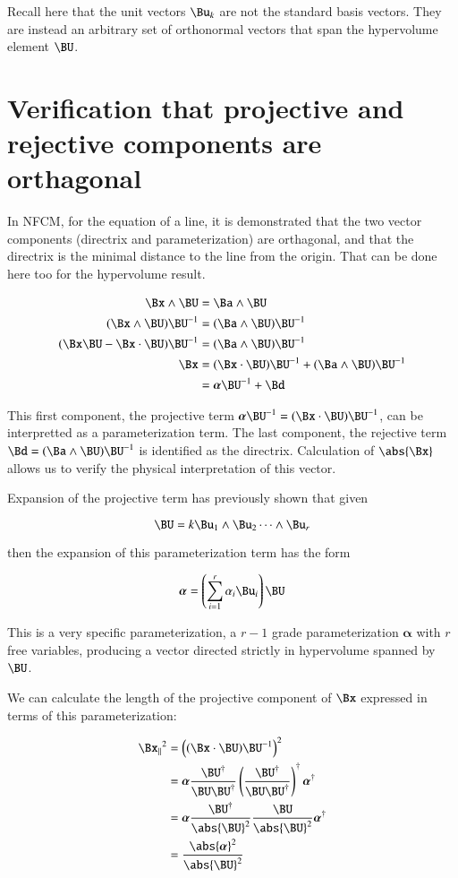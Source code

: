 \documentclass{article}
\newcommand{\Balpha}[0]{\boldsymbol{\alpha}}
\begin{document}
Recall here that the unit vectors $\Bu_k$ are not the standard basis vectors.
They are instead an arbitrary set of orthonormal vectors that span the hypervolume element $\BU$.

\section{ Verification that projective and rejective components are orthagonal }

In NFCM, for the equation of a line, it is demonstrated that the two vector components (directrix and parameterization) are orthagonal, and that the directrix is the minimal distance to the line from the origin.  That can be done here too for the hypervolume result.

\begin{align*}
\Bx \wedge \BU &= \Ba \wedge \BU \\
(\Bx \wedge \BU){\BU}^{-1} &= (\Ba \wedge \BU){\BU}^{-1} \\
(\Bx\BU - \Bx \cdot \BU){\BU}^{-1} &= (\Ba \wedge \BU){\BU}^{-1} \\
\Bx &= (\Bx \cdot \BU){\BU}^{-1} + (\Ba \wedge \BU){\BU}^{-1} \\
    &= \Balpha{\BU}^{-1} + \Bd \\
\end{align*}

This first component, the projective term $\Balpha{\BU}^{-1} = (\Bx \cdot \BU){\BU}^{-1}$, can be interpretted as a parameterization term.  The 
last component, the rejective term $\Bd = (\Ba \wedge \BU){\BU}^{-1}$ is identified as the directrix.  Calculation of $\abs{\Bx}$ allows us to verify the physical interpretation of this vector.

Expansion of the projective term has previously shown that given

\[
\BU = k \Bu_1 \wedge \Bu_2 \cdots \wedge \Bu_r
\]

then the expansion of this parameterization term has the form

\[
\Balpha = \left(\sum_{i = 1}^{r}{\alpha_i \Bu_i}\right)\BU
\]

This is a very specific parameterization, a $r-1$ grade parameterization $\Balpha$ with $r$ free variables, producing
a vector directed strictly in hypervolume spanned by $\BU$.

We can calculate the length of the projective component of $\Bx$ expressed in terms of this parameterization:

\begin{align*}
{\Bx_\parallel}^2
&= \left((\Bx \cdot \BU) {\BU}^{-1}\right)^2 \\
&= \Balpha \frac{{\BU}^\dagger}{\BU \BU^\dagger}   \left( \frac{{\BU}^\dagger}{\BU \BU^\dagger} \right)^\dagger {\Balpha}^\dagger \\
&= \Balpha \frac{{\BU}^\dagger} {\abs{\BU}^2} \frac{\BU} {\abs{\BU}^2} {\Balpha}^\dagger \\
&= \frac{\abs{\Balpha}^2}{{\abs{\BU}^2}} \\
\end{align*}
\end{document}
